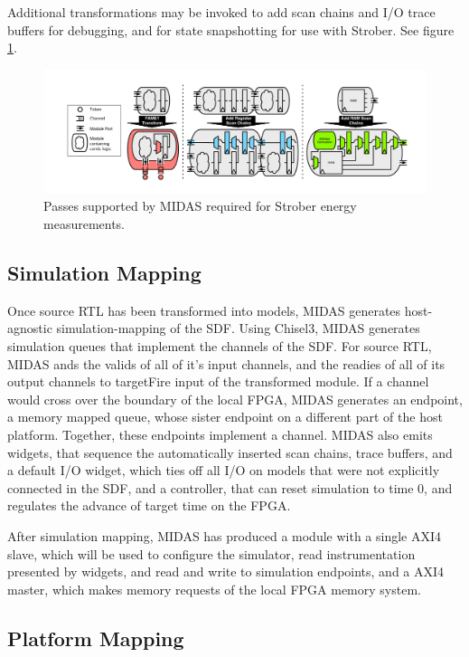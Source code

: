 Additional transformations may be invoked to add scan chains and I/O trace
buffers for debugging, and for state snapshotting for use with
Strober\cite{strober}. See figure \ref{fig:midas-passes}.

\begin{figure}
	\centering
	\includegraphics[width=16cm]{figures/midas-passes.pdf}
	\caption{Passes supported by MIDAS required for Strober energy measurements.}
	\label{fig:midas-passes}
	\centering
\end{figure}
\subsection{Simulation Mapping}

Once source RTL has been transformed into models, MIDAS generates host-agnostic
simulation-mapping of the SDF. Using Chisel3, MIDAS generates simulation queues
that implement the channels of the SDF. For source RTL, MIDAS ands the valids
of all of it's input channels, and the readies of all of its output channels to
targetFire input of the transformed module. If a channel would cross over the
boundary of the local FPGA, MIDAS generates an endpoint, a memory mapped queue,
whose sister endpoint on a different part of the host platform. Together, these
endpoints implement a channel.  MIDAS also emits widgets, that sequence the
automatically inserted scan chains, trace buffers, and a default I/O widget,
which ties off all I/O on models that were not explicitly connected in the SDF,
and a controller, that can reset simulation to time 0, and regulates the
advance of target time on the FPGA.

After simulation mapping, MIDAS has produced a module with a single AXI4 slave,
which will be used to configure the simulator, read instrumentation presented
by widgets, and read and write to simulation endpoints, and a AXI4 master,
which makes memory requests of the local FPGA memory system.


\subsection{Platform Mapping}

